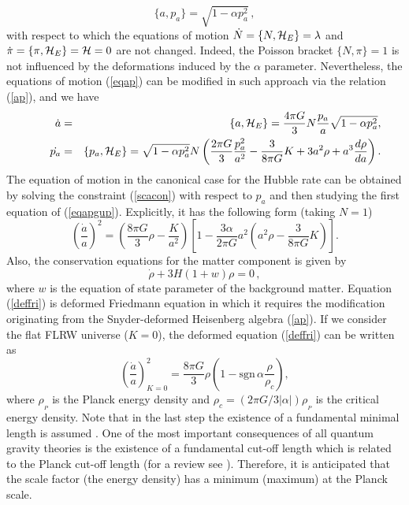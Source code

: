 \documentclass[showpacs,amsmath,nofootinbib,amssymb,epsfig]{revtex4}
\begin{document}
\begin{equation}\label{ap}
\{a,p_{a}\}=\sqrt{1-\alpha p_{a}^{2}}\,,
\end{equation}
 with respect to which the equations of motion $\dot{N}=\{N,{\cal H}_E\}=\lambda$ and $\dot{\pi}=\{\pi,{\cal H}_E\}={\cal H}=0$ are not changed. Indeed, the Poisson bracket $\{N,\pi\}=1$ is not influenced by the deformations induced by the $\alpha$ parameter. Nevertheless, the equations of motion (\ref{eqap}) can be modified in such approach via the relation (\ref{ap}), and we have
\begin{eqnarray}\label{eqapgup}
\dot{a}&=&\{a,{\cal H}_E\}=\frac{4\pi G}{3}N\frac{p_{a}}{a}\sqrt{1-\alpha p_{a}^{2}}, \\\nonumber \qquad \dot{p_{a}}&=&\{p_{a},{\cal H}_E\}=\sqrt{1-\alpha p_{a}^{2}}N\left(\frac{2\pi G}{3}\frac{p_{a}^{2}}{a^{2}}-\frac{3}{8\pi G}K+3a^{2}\rho+a^{3}\frac{d\rho}{da}\right).
\end{eqnarray}
The equation of motion in the canonical case for the Hubble rate can be obtained by solving the constraint (\ref{scacon}) with respect to $p_a$ and then studying the first equation of (\ref{eqapgup}). Explicitly, it has the following form (taking $N=1$)
\begin{equation}\label{deffri}
\left(\frac{\dot{a}}{a}\right)^{2}=\left(\frac{8\pi G}{3}\rho-\frac{K}{a^{2}}\right)\left[1-\frac{3\alpha}{2\pi G}a^{2}\left(a^{2}\rho-\frac{3}{8\pi G}K\right)\right].
\end{equation}
Also, the conservation equations for the matter component is
given by
\begin{equation}\label{ma}
\dot{\rho}+ 3H( 1+ w)\rho =0\,,
\end{equation}
where $w$ is the equation of state parameter of the background matter.
Equation (\ref{deffri}) is deformed Friedmann equation in which it requires the modification originating  from the Snyder-deformed Heisenberg algebra (\ref{ap}). If we consider the flat FLRW universe ($K=0$), the deformed equation (\ref{deffri}) can be written as \cite{marco}
\begin{equation}\label{modfri}
\left(\frac{\dot{a}}{a}\right)^{2}_{K=0}=\frac{8\pi G}{3}\rho\left(1-\text{sgn}\,\alpha\frac{\rho}{\rho_{c}}\right),
\end{equation}
where $\rho_{_{P}}$ is the Planck  energy density and $\rho_{c}=(2\pi G/3|\alpha|)\rho_{_{P}}$ is the critical energy density. Note that in the last step the existence of a fundamental minimal length is assumed . One of the most important consequences of all quantum gravity theories is the existence of a fundamental cut-off length which is related to the Planck cut-off length (for a review see \cite{gar}). Therefore, it is anticipated that the scale factor (the energy density) has a minimum (maximum) at the Planck scale.
\end{document}
